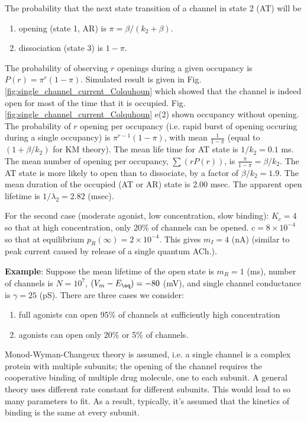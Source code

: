 The probability that the next state transition of a channel in state 2 (AT) will
be
\begin{enumerate}
  \item opening (state 1, AR) is $\pi = \beta/(k_2+\beta)$.
  \item dissociation (state 3) is $1-\pi$.
\end{enumerate}

The probability of observing $r$ openings during a given occupancy is $P(r) =
\pi^r(1-\pi)$. Simulated result is given in
Fig.\ref{fig:single_channel_current_Colquhoun} which showed that the channel is
indeed open for most of the time that it is occupied.
Fig.\ref{fig:single_channel_current_Colquhoun} e(2) shown occupancy without
opening. The probability of $r$ opening per occupancy (i.e. rapid burst of
opening occuring during a single occupancy) is $\pi^{r-1}(1-\pi)$, with mean
$\frac{1}{1-\pi}$ (equal to $(1+\beta/k_2)$ for KM theory).
The mean life time for AT state is $1/k_2=0.1$ ms.
The mean number of opening per occupancy, $\sum (rP(r))$, is $\frac{\pi}{1-\pi}
= \beta/k_2$. The AT state is more likely to open than to dissociate, by a
factor of $\beta/k_2 = 1.9$.   The mean duration of the occupied (AT or AR)
state is 2.00 msec. The apparent open lifetime is $1/\lambda_2 = 2.82$ (msec).


For the second case (moderate agonist, low concentration, slow binding): $K_c=4$
so that at high concentration, only 20\% of channels can be opened. $c=8\times
10^{-4}$ so that at equilibrium $p_R(\infty) = 2\times 10^{-4}$. This gives
$m_I = 4$ (nA) (similar to peak current caused by release of a single quantum
ACh.).


{\bf Example}:\citep{colquhoun1977rfm} Suppose the mean lifetime of the open
state is $m_R = 1$ (ms), number of channels is $N=10^7$, $(V_m-E_\eq) = -80$
(mV), and single channel conductance is $\gamma = 25$ (pS). There are three
cases we consider:
\begin{enumerate}
  \item  full agonists
can open 95\% of channels at sufficiently high concentration
\item agonists can open only 20\% or 5\% of channels.
\end{enumerate}
Monod-Wyman-Changeux theory is assumed, i.e. a single channel is a complex
protein with multiple subunits; the opening of the channel requires the
cooperative binding of multiple drug molecule, one to each subunit. A general
theory uses different rate constant for different subunits. This would lead to
so many parameters to fit. As a result, typically, it's assumed that the
kinetics of binding is the same at every subunit.

